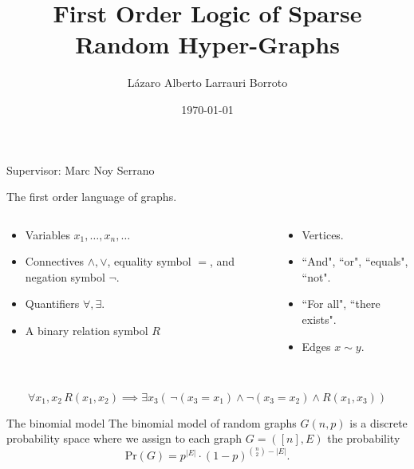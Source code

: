 \documentclass[11pt]{beamer}
\title[First Order Logic of Sparse Random Hyper-Graphs]{First Order
	Logic of Sparse Random Hyper-Graphs}
\author{L\'azaro Alberto Larrauri Borroto}
\date\today
\begin{document}
 \begin{frame}[plain]
	\maketitle
	\small
	\begin{center}
	Supervisor: Marc Noy Serrano
	\end{center}
 \end{frame}


	\begin{frame}{The first order language of graphs.}
		\begin{columns}
			\begin{column}{0.55\textwidth}
				\begin{itemize}
					\item Variables $x_1, \dots, x_n, \dots$
					\item Connectives $\wedge, \vee$, equality symbol $=$,
					and negation symbol $\neg$.
					\item Quantifiers $\forall, \exists$.
					\item A binary relation symbol $R$
				\end{itemize}
			\end{column}
			\begin{column}{0.45\textwidth}
				\begin{itemize}
					\item Vertices.
					\item ``And", ``or", ``equals", ``not".
					\item ``For all", ``there exists".
					\item Edges $x\sim y$. 
				\end{itemize}
			\end{column}
		\end{columns}
		~\\
		\[ \forall x_1,x_2 \, R(x_1,x_2) \implies \exists x_3 (\,
		\neg(x_3=x_1)\wedge \neg(x_3=x_2) \wedge R(x_1, x_3))\]
	\end{frame}

	\begin{frame}{The binomial model}
	The binomial model of random graphs $G(n,p)$ is a discrete probability space where 
	we assign to each graph $G=([n],E)$ the probability
	\[\mathrm{Pr}(G)= p^{|E|}\cdot (1-p)^{\binom{n}{2}- |E| }. \]
	\end{frame}
\end{document}
